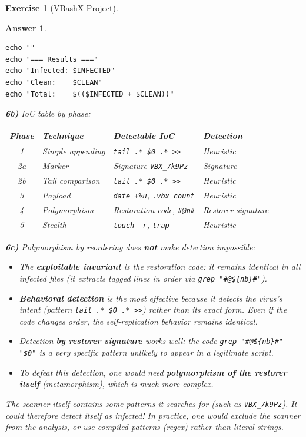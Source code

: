 \documentclass[a4paper,11pt]{article}
\theoremstyle{plain}
\newtheorem{correction}{Answer}
\theoremstyle{definition}
\newtheorem{exercice}{Exercise}
\begin{document}
\begin{exercice}[VBashX Project]
\begin{correction}
\begin{lstlisting}[title=scanner.sh]
echo ""
echo "=== Results ==="
echo "Infected: $INFECTED"
echo "Clean:    $CLEAN"
echo "Total:    $(($INFECTED + $CLEAN))"
\end{lstlisting}

\textbf{6b)} IoC table by phase:
\begin{center}
\begin{tabular}{clll}
\toprule
\textbf{Phase} & \textbf{Technique} & \textbf{Detectable IoC} & \textbf{Detection} \\
\midrule
1 & Simple appending & \texttt{tail .* \$0 .* >>} & Heuristic \\
2a & Marker & Signature \texttt{VBX\_7k9Pz} & Signature \\
2b & Tail comparison & \texttt{tail .* \$0 .* >>} & Heuristic \\
3 & Payload & \texttt{date +\%u}, \texttt{.vbx\_count} & Heuristic \\
4 & Polymorphism & Restoration code, \texttt{\#@n\#} & Restorer signature \\
5 & Stealth & \texttt{touch -r}, \texttt{trap} & Heuristic \\
\bottomrule
\end{tabular}
\end{center}

\textbf{6c)} Polymorphism by reordering does \textbf{not} make detection impossible:
\begin{itemize}
    \item The \textbf{exploitable invariant} is the restoration code: it remains identical in all infected files (it extracts tagged lines in order via \texttt{grep "\#@\$\{nb\}\#"}).
    \item \textbf{Behavioral detection} is the most effective because it detects the virus's \textit{intent} (pattern \texttt{tail .* \$0 .* >>}) rather than its exact form. Even if the code changes order, the self-replication behavior remains identical.
    \item Detection \textbf{by restorer signature} works well: the code \texttt{grep "\#@\$\{nb\}\#" "\$0"} is a very specific pattern unlikely to appear in a legitimate script.
    \item To defeat this detection, one would need \textbf{polymorphism of the restorer itself} (metamorphism), which is much more complex.
\end{itemize}

\begin{attention}
The scanner itself contains some patterns it searches for (such as \texttt{VBX\_7k9Pz}). It could therefore detect itself as infected! In practice, one would exclude the scanner from the analysis, or use compiled patterns (regex) rather than literal strings.
\end{attention}


\end{correction}
\end{exercice}
\end{document}
